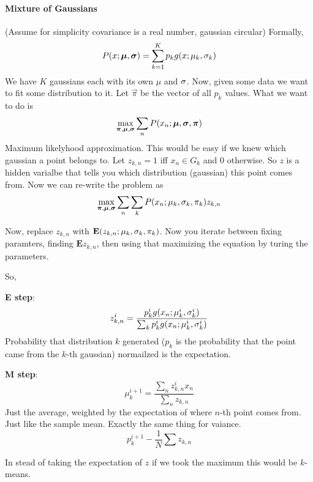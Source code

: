 \paragraph{Mixture of Gaussians}
\label{sec:mixture-gaussians}
(Assume for simplicity covariance is a real number, gaussian circular)
Formally, $$P(x; \boldsymbol{\mu}, \boldsymbol{\sigma}) = \sum_{k=1}^K p_k g(x; \mu_k, \sigma_k)$$
We have $K$ gaussians each with its own $\mu$ and $\sigma$. Now, given
some data we want to fit some distribution to it. Let $\vec \pi$ be the
vector of all $p_k$ values. What we want to do is
$$  \max_{\boldsymbol{\pi}, \boldsymbol{\mu}, \boldsymbol{\sigma}} \sum_n P(x_n; \boldsymbol{\mu}, \boldsymbol{\sigma},
  \boldsymbol{\pi})
$$
Maximum likelyhood approximation. This would be easy if we knew which
gaussian a point belongs to. Let $z_{k,n} = 1 $ iff $x_n \in G_k$
and $0$ otherwise. So $z$ is a hidden varialbe that tells you which
distribution (gaussian) this point comes from. Now we can re-write the
problem as
\begin{equation}
  \label{eq:43}
  \max_{\boldsymbol{\pi}, \boldsymbol{\mu}, \boldsymbol{\sigma}} \sum_n \sum_k P(x_n; \mu_k, \sigma_k, \pi_k)z_{k,n}
\end{equation}

Now, replace $z_{k,n}$ with $\mathbf{E}(z_{k, n}; \mu_k, \sigma_k,
\pi_k)$. Now you iterate between fixing paramters, finding
$\mathbf{E}z_{k,n}$, then using that maximizing the equation by turing
the parameters.

So, 

\textbf{E step}:
\begin{equation}
z_{k,n}^i = \frac{p_k^i g(x_n; \mu_k^i, \sigma_k^i)}{\sum_k
  p_k^ig(x_n; \mu_k^i, \sigma_k^i) }\label{eq:44}
\end{equation}
Probability that distribution $k$ generated ($p_k$ is the probability
that the point came from the $k$-th gaussian) normailzed is the expectation.

\textbf{M step}:
\begin{equation}
  \label{eq:45}
  \mu_k^{i+1} = \frac{\sum_{n}  z_{k,n}^i x_n}{\sum_n z_{k,n}}
\end{equation}
Just the average, weighted by the expectation of where $n$-th point
comes from. Just like the sample mean. Exactly the same thing for
vaiance.
\begin{equation}
  \label{eq:46}
  p_k^{i+1} - \frac{1}{N}\sum z_{k,n}
\end{equation}

In stead of taking the expectation of $z$ if we took the maximum this
would be $k$-means. 

